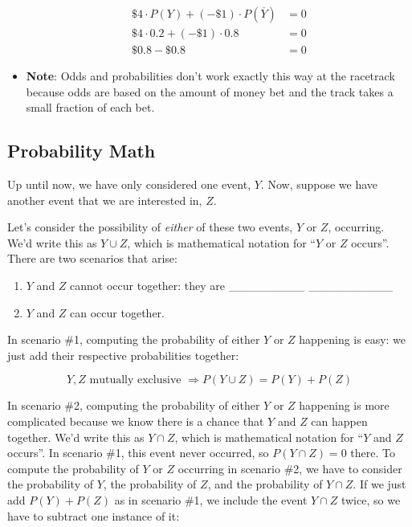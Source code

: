 \documentclass[]{book}
\providecommand{\tightlist}{%
  \setlength{\itemsep}{0pt}\setlength{\parskip}{0pt}}
\theoremstyle{definition}
\theoremstyle{definition}
\theoremstyle{remark}
\begin{document}
\begin{itemize}
  \begin{align*}
  \$4\cdot P(Y) + (-\$1) \cdot P(\overline{Y}) & = 0 \\
  \$4\cdot 0.2 + (-\$1) \cdot 0.8 & = 0 \\
  \$0.8 - \$0.8 & = 0
  \end{align*}
\item
  \textbf{Note}: Odds and probabilities don't work exactly this way at
  the racetrack because odds are based on the amount of money bet and
  the track takes a small fraction of each bet.
\end{itemize}

\subsection{Probability Math}\label{probability-math}

Up until now, we have only considered one event, \(Y\). Now, suppose we
have another event that we are interested in, \(Z\).

Let's consider the possibility of \emph{either} of these two events,
\(Y\) or \(Z\), occurring. We'd write this as \(Y \cup Z\), which is
mathematical notation for ``\(Y\) or \(Z\) occurs''. There are two
scenarios that arise: \vspace{.1in}

\begin{enumerate}
\def\labelenumi{\arabic{enumi}.}
\tightlist
\item
  \(Y\) and \(Z\) cannot occur together: they are \_\_\_\_\_\_\_\_\_
  \_\_\_\_\_\_\_\_\_\_ \vspace{.1in}
\item
  \(Y\) and \(Z\) can occur together.
\end{enumerate}

In scenario \#1, computing the probability of either \(Y\) or \(Z\)
happening is easy: we just add their respective probabilities together:

\[ Y,Z \text{ mutually exclusive } \Rightarrow P(Y \cup Z) = P(Y) + P(Z)\]

In scenario \#2, computing the probability of either \(Y\) or \(Z\)
happening is more complicated because we know there is a chance that
\(Y\) and \(Z\) can happen together. We'd write this as \(Y \cap Z\),
which is mathematical notation for ``\(Y\) and \(Z\) occurs''. In
scenario \#1, this event never occurred, so \(P(Y \cap Z) = 0\) there.
To compute the probability of \(Y\) or \(Z\) occurring in scenario \#2,
we have to consider the probability of \(Y\), the probability of \(Z\),
and the probability of \(Y \cap Z\). If we just add \(P(Y) + P(Z)\) as
in scenario \#1, we include the event \(Y \cap Z\) twice, so we have to
subtract one instance of it:
\end{document}
